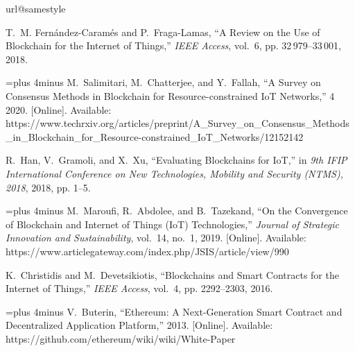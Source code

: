 \documentclass[conference]{IEEEtran}
\begin{document}
\begin{thebibliography}{10}
\providecommand{\url}[1]{#1}
\csname url@samestyle\endcsname
\providecommand{\newblock}{\relax}
\providecommand{\bibinfo}[2]{#2}
\providecommand{\BIBentrySTDinterwordspacing}{\spaceskip=0pt\relax}
\providecommand{\BIBentryALTinterwordstretchfactor}{4}
\providecommand{\BIBentryALTinterwordspacing}{\spaceskip=\fontdimen2\font plus
\BIBentryALTinterwordstretchfactor\fontdimen3\font minus
  \fontdimen4\font\relax}
\providecommand{\BIBforeignlanguage}[2]{{%
\expandafter\ifx\csname l@#1\endcsname\relax
\typeout{** WARNING: IEEEtran.bst: No hyphenation pattern has been}%
\typeout{** loaded for the language `#1'. Using the pattern for}%
\typeout{** the default language instead.}%
\else
\language=\csname l@#1\endcsname
\fi
#2}}
\providecommand{\BIBdecl}{\relax}
\BIBdecl

T.~M. {Fern\'{a}ndez-Caram\'{e}s} and P.~{Fraga-Lamas}, ``{A Review on the Use
  of Blockchain for the Internet of Things},'' \emph{IEEE Access}, vol.~6, pp.
  32\,979--33\,001, 2018.

\BIBentryALTinterwordspacing
M.~Salimitari, M.~Chatterjee, and Y.~Fallah, ``{A Survey on Consensus Methods
  in Blockchain for Resource-constrained IoT Networks},'' 4 2020. [Online].
  Available:
  \url{https://www.techrxiv.org/articles/preprint/A_Survey_on_Consensus_Methods_in_Blockchain_for_Resource-constrained_IoT_Networks/12152142}
\BIBentrySTDinterwordspacing

R.~Han, V.~Gramoli, and X.~Xu, ``{Evaluating Blockchains for IoT},'' in
  \emph{9th IFIP International Conference on New Technologies, Mobility and
  Security (NTMS), 2018}, 2018, pp. 1--5.

\BIBentryALTinterwordspacing
M.~Maroufi, R.~Abdolee, and B.~Tazekand, ``{On the Convergence of Blockchain
  and Internet of Things (IoT) Technologies},'' \emph{Journal of Strategic
  Innovation and Sustainability}, vol.~14, no.~1, 2019. [Online]. Available:
  \url{https://www.articlegateway.com/index.php/JSIS/article/view/990}
\BIBentrySTDinterwordspacing

K.~Christidis and M.~{Devetsikiotis}, ``{Blockchains and Smart Contracts for
  the Internet of Things},'' \emph{IEEE Access}, vol.~4, pp. 2292--2303, 2016.

\BIBentryALTinterwordspacing
V.~Buterin, ``{Ethereum: A Next-Generation Smart Contract and Decentralized
  Application Platform},'' 2013. [Online]. Available:
  \url{https://github.com/ethereum/wiki/wiki/White-Paper}
\BIBentrySTDinterwordspacing


\end{thebibliography}
\end{document}
